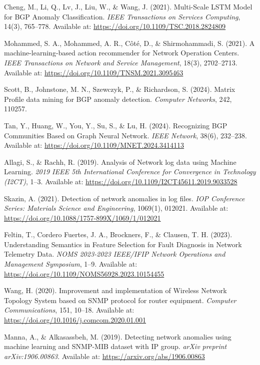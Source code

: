 \documentclass[11pt]{article}
\begin{document}
\begin{thebibliography}{9}

Cheng, M., Li, Q., Lv, J., Liu, W., \& Wang, J. (2021).
Multi-Scale LSTM Model for BGP Anomaly Classification.
\textit{IEEE Transactions on Services Computing}, 14(3), 765--778.
Available at: \href{https://doi.org/10.1109/TSC.2018.2824809}{https://doi.org/10.1109/TSC.2018.2824809}

Mohammed, S. A., Mohammed, A. R., Côté, D., \& Shirmohammadi, S. (2021).
A machine-learning-based action recommender for Network Operation Centers.
\textit{IEEE Transactions on Network and Service Management}, 18(3), 2702--2713.
Available at: \href{https://doi.org/10.1109/TNSM.2021.3095463}{https://doi.org/10.1109/TNSM.2021.3095463}

Scott, B., Johnstone, M. N., Szewczyk, P., \& Richardson, S. (2024).
Matrix Profile data mining for BGP anomaly detection.
\textit{Computer Networks}, 242, 110257.

Tan, Y., Huang, W., You, Y., Su, S., \& Lu, H. (2024).
Recognizing BGP Communities Based on Graph Neural Network.
\textit{IEEE Network}, 38(6), 232--238.
Available at: \href{https://doi.org/10.1109/MNET.2024.3414113}{https://doi.org/10.1109/MNET.2024.3414113}

Allagi, S., \& Rachh, R. (2019).
Analysis of Network log data using Machine Learning.
\textit{2019 IEEE 5th International Conference for Convergence in Technology (I2CT)}, 1--3.
Available at: \href{https://doi.org/10.1109/I2CT45611.2019.9033528}{https://doi.org/10.1109/I2CT45611.2019.9033528}

Skazin, A. (2021).
Detection of network anomalies in log files.
\textit{IOP Conference Series: Materials Science and Engineering}, 1069(1), 012021.
Available at: \href{https://doi.org/10.1088/1757-899X/1069/1/012021}{https://doi.org/10.1088/1757-899X/1069/1/012021}

Feltin, T., Cordero Fuertes, J. A., Brockners, F., \& Clausen, T. H. (2023).
Understanding Semantics in Feature Selection for Fault Diagnosis in Network Telemetry Data.
\textit{NOMS 2023-2023 IEEE/IFIP Network Operations and Management Symposium}, 1--9.
Available at: \href{https://doi.org/10.1109/NOMS56928.2023.10154455}{https://doi.org/10.1109/NOMS56928.2023.10154455}

Wang, H. (2020).
Improvement and implementation of Wireless Network Topology System based on SNMP protocol for router equipment.
\textit{Computer Communications}, 151, 10--18.
Available at: \href{https://doi.org/10.1016/j.comcom.2020.01.001}{https://doi.org/10.1016/j.comcom.2020.01.001}

Manna, A., \& Alkasassbeh, M. (2019).
Detecting network anomalies using machine learning and SNMP-MIB dataset with IP group.
\textit{arXiv preprint arXiv:1906.00863}.
Available at: \href{https://arxiv.org/abs/1906.00863}{https://arxiv.org/abs/1906.00863}

\end{thebibliography}
\end{document}
